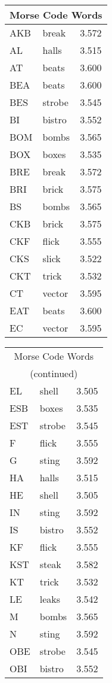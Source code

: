 \documentclass[11pt]{article}
\begin{document}
\begin{multicols}{3}
\begin{tabular}{|l|l|l|}
\hline
\multicolumn{3}{|c|}{Morse Code Words} \\
\hline
AKB & break & 3.572 \\
AL & halls & 3.515 \\
AT & beats & 3.600 \\
BEA & beats & 3.600 \\
BES & strobe & 3.545 \\
BI & bistro & 3.552 \\
BOM & bombs & 3.565 \\
BOX & boxes & 3.535 \\
BRE & break & 3.572 \\
BRI & brick & 3.575 \\
BS & bombs & 3.565 \\
CKB & brick & 3.575 \\
CKF & flick & 3.555 \\
CKS & slick & 3.522 \\
CKT & trick & 3.532 \\
CT & vector & 3.595 \\
EAT & beats & 3.600 \\
EC & vector & 3.595 \\
\hline
\end{tabular}
\begin{tabular}{|l|l|l|}
\hline
\multicolumn{3}{|c|}{Morse Code Words} \\
\multicolumn{3}{|c|}{(continued)} \\
\hline
EL & shell & 3.505 \\
ESB & boxes & 3.535 \\
EST & strobe & 3.545 \\
F & flick & 3.555 \\
G & sting & 3.592 \\
HA & halls & 3.515 \\
HE & shell & 3.505 \\
IN & sting & 3.592 \\
IS & bistro & 3.552 \\
KF & flick & 3.555 \\
KST & steak & 3.582 \\
KT & trick & 3.532 \\
LE & leaks & 3.542 \\
M & bombs & 3.565 \\
N & sting & 3.592 \\
OBE & strobe & 3.545 \\
OBI & bistro & 3.552 \\

\end{tabular}
\end{multicols}
\end{document}
